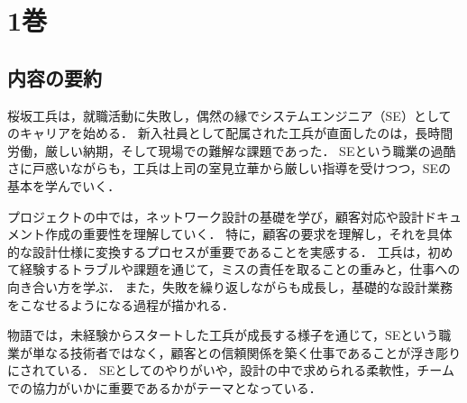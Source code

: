 \documentclass[titlepage,a4paper]{jsarticle}
\begin{document}



\section{1巻}
\subsection{内容の要約}
桜坂工兵は，就職活動に失敗し，偶然の縁でシステムエンジニア（SE）としてのキャリアを始める．
新入社員として配属された工兵が直面したのは，長時間労働，厳しい納期，そして現場での難解な課題であった．
SEという職業の過酷さに戸惑いながらも，工兵は上司の室見立華から厳しい指導を受けつつ，SEの基本を学んでいく．

プロジェクトの中では，ネットワーク設計の基礎を学び，顧客対応や設計ドキュメント作成の重要性を理解していく．
特に，顧客の要求を理解し，それを具体的な設計仕様に変換するプロセスが重要であることを実感する．
工兵は，初めて経験するトラブルや課題を通じて，ミスの責任を取ることの重みと，仕事への向き合い方を学ぶ．
また，失敗を繰り返しながらも成長し，基礎的な設計業務をこなせるようになる過程が描かれる．

物語では，未経験からスタートした工兵が成長する様子を通じて，SEという職業が単なる技術者ではなく，顧客との信頼関係を築く仕事であることが浮き彫りにされている．
SEとしてのやりがいや，設計の中で求められる柔軟性，チームでの協力がいかに重要であるかがテーマとなっている．
\end{document}
